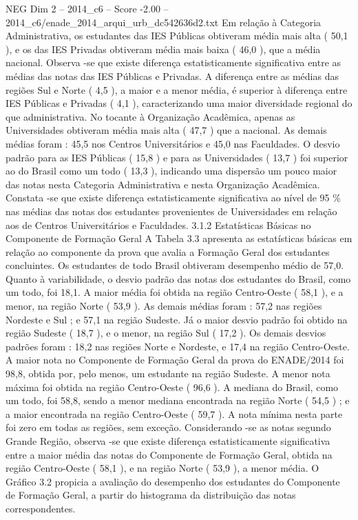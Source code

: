 \begin{textsample}{NEG Dim 2 – 2014\_c6 – Score -2.00 – 2014\_c6/enade\_2014\_arqui\_urb\_dc542636d2.txt}
Em relação à Categoria Administrativa, os estudantes das IES Públicas obtiveram média mais alta ( 50,1 ), e os das IES Privadas obtiveram média mais baixa ( 46,0 ), que a média nacional.
Observa -se que existe diferença estatisticamente significativa entre as médias das notas das IES Públicas e Privadas.
A diferença entre as médias das regiões Sul e Norte ( 4,5 ), a maior e a menor média, é superior à diferença entre IES Públicas e Privadas ( 4,1 ), caracterizando uma maior diversidade regional do que administrativa.
No tocante à Organização Acadêmica, apenas as Universidades obtiveram média mais alta ( 47,7 ) que a nacional.
As demais médias foram : 45,5 nos Centros Universitários e 45,0 nas Faculdades.
O desvio padrão para as IES Públicas ( 15,8 ) e para as Universidades ( 13,7 ) foi superior ao do Brasil como um todo ( 13,3 ), indicando uma dispersão um pouco maior das notas nesta Categoria Administrativa e nesta Organização Acadêmica.
Constata -se que existe diferença estatisticamente significativa ao nível de 95 \% nas médias das notas dos estudantes provenientes de Universidades em relação aos de Centros Universitários e Faculdades. 3.1.2 Estatísticas Básicas no Componente de Formação Geral A Tabela 3.3 apresenta as estatísticas básicas em relação ao componente da prova que avalia a Formação Geral dos estudantes concluintes.
Os estudantes de todo Brasil obtiveram desempenho médio de 57,0.
Quanto à variabilidade, o desvio padrão das notas dos estudantes do Brasil, como um todo, foi 18,1.
A maior média foi obtida na região Centro-Oeste ( 58,1 ), e a menor, na região Norte ( 53,9 ).
As demais médias foram : 57,2 nas regiões Nordeste e Sul ; e 57,1 na região Sudeste.
Já o maior desvio padrão foi obtido na região Sudeste ( 18,7 ), e o menor, na região Sul ( 17,2 ).
Os demais desvios padrões foram : 18,2 nas regiões Norte e Nordeste, e 17,4 na região Centro-Oeste.
A maior nota no Componente de Formação Geral da prova do ENADE/2014 foi 98,8, obtida por, pelo menos, um estudante na região Sudeste.
A menor nota máxima foi obtida na região Centro-Oeste ( 96,6 ).
A mediana do Brasil, como um todo, foi 58,8, sendo a menor mediana encontrada na região Norte ( 54,5 ) ; e a maior encontrada na região Centro-Oeste ( 59,7 ).
A nota mínima nesta parte foi zero em todas as regiões, sem exceção.
Considerando -se as notas segundo Grande Região, observa -se que existe diferença estatisticamente significativa entre a maior média das notas do Componente de Formação Geral, obtida na região Centro-Oeste ( 58,1 ), e na região Norte ( 53,9 ), a menor média.
O Gráfico 3.2 propicia a avaliação do desempenho dos estudantes do Componente de Formação Geral, a partir do histograma da distribuição das notas correspondentes.

\end{textsample}
